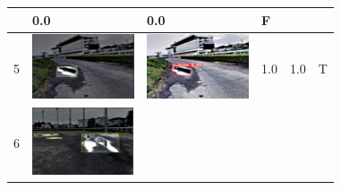 \documentclass[10pt]{jarticle}
\begin{document}
\begin{table}[H]
\begin{tabular}{|l|l|l|l|l|l|}
\begin{minipage}{.1\textwidth}
           \end{minipage}       & 0.0 & 0.0 & F      \\ \hline
        5  & \begin{minipage}{.1\textwidth}
            \centering
            \includegraphics[width=0.9\linewidth]{./fig/2tab5_a.png}
           \end{minipage}       & \begin{minipage}{.1\textwidth}
            \centering
            \includegraphics[width=0.9\linewidth]{./fig/2tab5_r.png}
           \end{minipage}       & 1.0 & 1.0 & T       \\ \hline
        6  & \begin{minipage}{.1\textwidth}
            \centering
            \includegraphics[width=0.9\linewidth]{./fig/2tab6_a.png}

\end{minipage}
\end{tabular}
\end{table}
\end{document}
